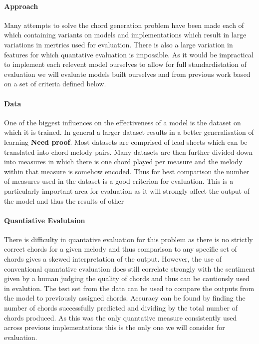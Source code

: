 \paragraph{Approach}
Many attempts to solve the chord generation problem have been made each of which containing variants on models and implementations which result in large variations in mertrics used for evaluation.
There is also a large variation in features for which quantative evaluation is impossible. 
As it would be impractical to implement each relevent model ourselves to allow for full standardistation of evaluation we will evaluate models built ourselves and from previous work based on a set of criteria defined below.
\paragraph{Data}
One of the biggest influences on the effectiveness of a model is the dataset on which it is trained. 
In general a larger dataset results in a better generalisation of learning \textbf{Need proof}.
Most datasets are comprised of lead sheets which can be translated into chord melody pairs.
Many datasets are then further divided down into measures in which there is one chord played per measure and the melody within that measure is somehow encoded.
Thus for best comparison the number of measures used in the dataset is a good criterion for evaluation.
This is a particularly important area for evaluation as it will strongly affect the output of the model and thus the results of other 

\paragraph{Quantiative Evalutaion}
There is difficulty in quantative evaluation for this problem as there is no strictly correct chords for a given melody and thus comparison to any specific set of chords gives a skewed interpretation of the output.
However, the use of conventional quantative evaluation does still correlate strongly with the sentiment given by a human judging the quality of chords and thus can be cautionsly used in evalution.
The test set from the data can be used to compare the outputs from the model to previously assigned chords. Accuracy can be found by finding the number of chords successfully predicted and dividing by the total number of chords produced.
As this was the only quantative measure consistently used across previous implementations this is the only one we will consider for evaluation.

